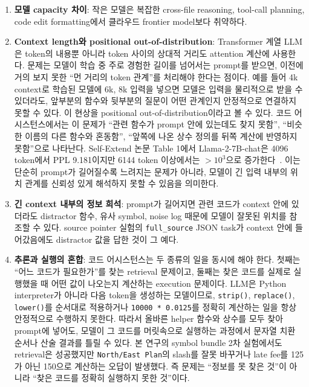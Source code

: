 \documentclass[11pt,a4paper]{article}
\begin{document}
\begin{enumerate}
  \item \textbf{모델 capacity 차이}: 작은 모델은 복잡한 cross-file reasoning, tool-call planning, code edit formatting에서 클라우드 frontier model보다 취약하다.
  \item \textbf{Context length와 positional out-of-distribution}: Transformer 계열 LLM은 token의 내용뿐 아니라 token 사이의 상대적 거리도 attention 계산에 사용한다. 문제는 모델이 학습 중 주로 경험한 길이를 넘어서는 prompt를 받으면, 이전에 거의 보지 못한 ``먼 거리의 token 관계''를 처리해야 한다는 점이다. 예를 들어 4k context로 학습된 모델에 6k, 8k 입력을 넣으면 모델은 입력을 물리적으로 받을 수 있더라도, 앞부분의 함수와 뒷부분의 질문이 어떤 관계인지 안정적으로 연결하지 못할 수 있다. 이 현상을 positional out-of-distribution이라고 볼 수 있다. 코드 어시스턴스에서는 이 문제가 ``관련 함수가 prompt 안에 있는데도 찾지 못함'', ``비슷한 이름의 다른 함수와 혼동함'', ``앞쪽에 나온 상수 정의를 뒤쪽 계산에 반영하지 못함''으로 나타난다. Self-Extend 논문 Table 1에서 Llama-2-7B-chat은 4096 token에서 PPL 9.181이지만 6144 token 이상에서는 $>10^3$으로 증가한다~\cite{jin2024selfextend}. 이는 단순히 prompt가 길어질수록 느려지는 문제가 아니라, 모델이 긴 입력 내부의 위치 관계를 신뢰성 있게 해석하지 못할 수 있음을 의미한다.
  \item \textbf{긴 context 내부의 정보 희석}: prompt가 길어지면 관련 코드가 context 안에 있더라도 distractor 함수, 유사 symbol, noise log 때문에 모델이 잘못된 위치를 참조할 수 있다. source pointer 실험의 \texttt{full\_source} JSON task가 context 안에 들어갔음에도 distractor 값을 답한 것이 그 예다.
  \item \textbf{추론과 실행의 혼합}: 코드 어시스턴스는 두 종류의 일을 동시에 해야 한다. 첫째는 ``어느 코드가 필요한가''를 찾는 retrieval 문제이고, 둘째는 찾은 코드를 실제로 실행했을 때 어떤 값이 나오는지 계산하는 execution 문제이다. LLM은 Python interpreter가 아니라 다음 token을 생성하는 모델이므로, \texttt{strip()}, \texttt{replace()}, \texttt{lower()}를 순서대로 적용하거나 \texttt{10000 * 0.0125}를 정확히 계산하는 일을 항상 안정적으로 수행하지 못한다. 따라서 올바른 helper 함수와 상수를 모두 찾아 prompt에 넣어도, 모델이 그 코드를 머릿속으로 실행하는 과정에서 문자열 치환 순서나 산술 결과를 틀릴 수 있다. 본 연구의 symbol bundle 2차 실험에서도 retrieval은 성공했지만 \texttt{North/East Plan}의 slash를 잘못 바꾸거나 late fee를 125가 아닌 150으로 계산하는 오답이 발생했다. 즉 문제는 ``정보를 못 찾은 것''이 아니라 ``찾은 코드를 정확히 실행하지 못한 것''이다.
\end{enumerate}
\end{document}

